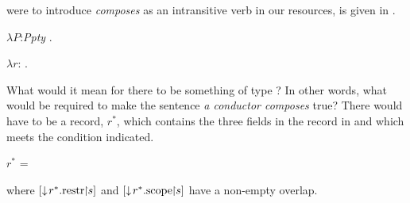 were to introduce \textit{composes} as an intransitive verb in our
resources, is given in
.
\begin{ex} 
\begin{subex} 
 
\item  $\lambda P$:\textit{Ppty}
. 
 
\item $\lambda
r$:
. 

\item {} 
 
\end{subex} 
   
\end{ex} 
What would it mean for there to be something of type ? In
other words, what would be required to make the sentence \textit{a
  conductor composes} true? There would have to be a record, $r^*$, which
contains the three fields in the record in \nexteg{} and which meets
the condition indicated.
\begin{ex} 
$r^*$ = 

where $[\downarrow\!r^*.\mathrm{restr}\!\!\restriction\!\!s]$ and $[\downarrow\!r^*.\mathrm{scope}\!\!\restriction\!\!s]$
                        have a non-empty overlap.    
\end{ex} 

